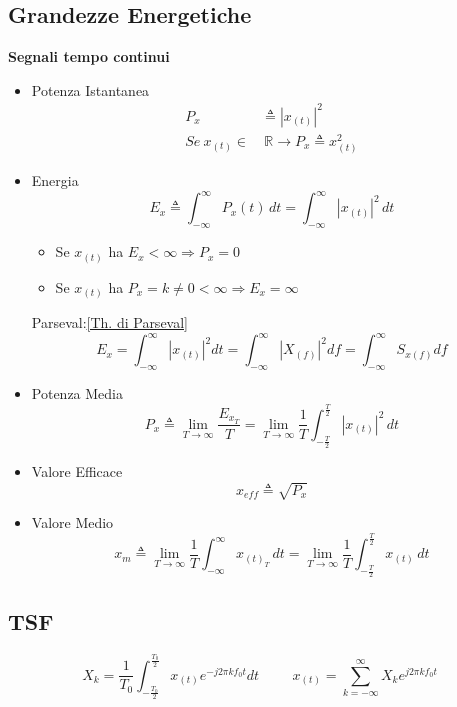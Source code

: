     \subsection{Grandezze Energetiche}\label{Grandezze Fisiche}
        \textbf{Segnali tempo continui}
        \begin{itemize}
            \item {Potenza Istantanea
                \begin{align}
                    P_{x} & \triangleq |x_{(t)}|^2 \nonumber \\   
                    Se\ x_{(t)} \in &\ \mathbb{R} \rightarrow P_{x} \triangleq x_{(t)}^2 \nonumber
                \end{align}
            }
            \item {Energia
                \[
                    E_{x} \triangleq \int_{-\infty}^{\infty} P_{x}(t) \,dt = \int_{-\infty}^{\infty} |x_{(t)}|^2 \,dt    
                \]
                \begin{itemize}
                    \item Se $x_{(t)}$ ha $E_x < \infty \Rightarrow P_x = 0$
                    \item Se $x_{(t)}$ ha $P_x = k \neq 0 < \infty \Rightarrow E_x = \infty$
                \end{itemize}
                Parseval:\ref{Th. di Parseval}
                \[
                    E_{x} = \int_{-\infty}^{\infty}|x_{(t)}|^2 dt = \int_{-\infty}^{\infty}|X_{(f)}|^2 df =\int_{-\infty}^{\infty} S_{x(f)} df
                \]
            }
            \item {Potenza Media
                \[
                    P_{x} \triangleq \lim_{T\rightarrow\infty} \frac{E_{x_{T}}}{T} =\lim_{T\rightarrow\infty} \frac{1}{T} \int_{-\frac{T}{2}}^{\frac{T}{2}}  |x_{(t)}|^2 \,dt    
                \]  
            }
            \item {Valore Efficace
                \[    
                    x_{eff} \triangleq \sqrt{P_{x}}
                \]
            }
            \item {Valore Medio
                \[
                    x_{m} \triangleq \lim_{T\rightarrow\infty} \frac{1}{T} \int_{-\infty}^{\infty}  x_{(t)_T} \,dt = \lim_{T\rightarrow\infty} \frac{1}{T} \int_{-\frac{T}{2}}^{\frac{T}{2}}  x_{(t)} \,dt 
                \]
            }
        \end{itemize}
    \subsection{TSF}
        \[
            X_k =\frac{1}{T_0}\int_{-\frac{T_0}{2}}^{\frac{T_0}{2}} x_{(t)} e^{-j2\pi kf_0t} dt \hspace{1cm} x_{(t)} = \sum_{k = -\infty}^{\infty} X_{k} e^{j2\pi kf_0t} 
        \]
